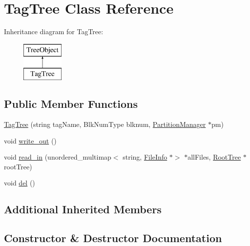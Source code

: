 \hypertarget{classTagTree}{}\section{Tag\+Tree Class Reference}
\label{classTagTree}
Inheritance diagram for Tag\+Tree\+:\begin{figure}[H]
\begin{center}
\leavevmode
\includegraphics[height=2.000000cm]{classTagTree}
\end{center}
\end{figure}
\subsection*{Public Member Functions}
\begin{DoxyCompactItemize}
\item 
\mbox{\hyperlink{classTagTree_a80b23fa47a18727a248c3db1e8b2ed83}{Tag\+Tree}} (string tag\+Name, Blk\+Num\+Type blknum, \mbox{\hyperlink{classPartitionManager}{Partition\+Manager}} $\ast$pm)
\item 
void \mbox{\hyperlink{classTagTree_adf13e01b25991ecfef1ad958e02c07fe}{write\+\_\+out}} ()
\item 
void \mbox{\hyperlink{classTagTree_af86ee6713fa03c3909e04608512b8b62}{read\+\_\+in}} (unordered\+\_\+multimap$<$ string, \mbox{\hyperlink{classFileInfo}{File\+Info}} $\ast$$>$ $\ast$all\+Files, \mbox{\hyperlink{classRootTree}{Root\+Tree}} $\ast$root\+Tree)
\item 
void \mbox{\hyperlink{classTagTree_ad8108969f4d28b938e55c8339f19db35}{del}} ()
\end{DoxyCompactItemize}
\subsection*{Additional Inherited Members}


\subsection{Constructor \& Destructor Documentation}
\mbox{\label{classTagTree_a80b23fa47a18727a248c3db1e8b2ed83}} 
